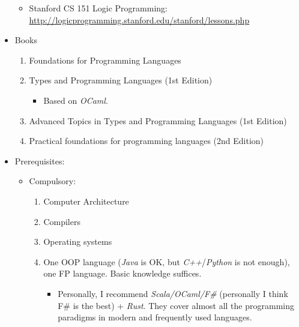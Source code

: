 \documentclass{article}
\begin{document}
\begin{itemize}
\begin{itemize}
\begin{itemize}
\begin{itemize}
                    \end{itemize}
            \end{itemize}

            \item Stanford CS 151 Logic Programming:\\
            \href{http://logicprogramming.stanford.edu/stanford/lessons.php}{http://logicprogramming.stanford.edu/stanford/lessons.php}
        \end{itemize}
    \item Books
    \begin{enumerate}
        \item Foundations for Programming Languages
        \cite{mitchell1996foundations}
        \item Types and Programming Languages (1st Edition)
        \cite{pierce2002types}
        \begin{itemize}
            \item Based on \emph{OCaml}.
        \end{itemize}
        \item Advanced Topics in Types and Programming Languages (1st Edition) \cite{pierce2004advanced}
        \item Practical foundations for programming languages (2nd Edition)
        \cite{harper2016practical}
    \end{enumerate}
    \item Prerequisites:
    \begin{itemize}
        \item Compulsory:
        \begin{enumerate}
            \item Computer Architecture
            \item Compilers
            \item Operating systems
            \item One OOP language  (\emph{Java} is OK, but \emph{C++}/\emph{Python} is not enough), one FP language.
            Basic knowledge suffices.
            \begin{itemize}
                \item Personally, I recommend \emph{Scala/OCaml/F\#} (personally I think F\# is the best) + \emph{Rust}.
                They cover almost all the programming paradigms in modern and frequently used languages.
            \end{itemize}
        \end{enumerate}
    \end{itemize}    
\end{itemize}
\end{document}
